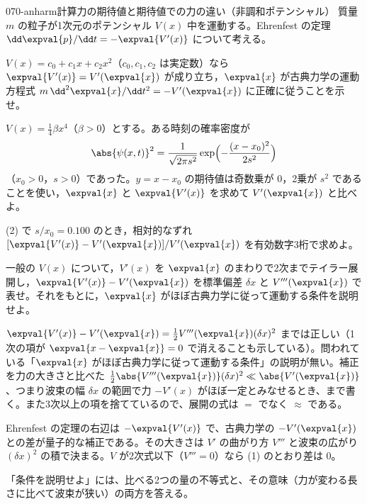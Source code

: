 \documentclass[uplatex,dvipdfmx,a4paper,11pt]{jsarticle}
\begin{document}
\mondaihen
{}
\begin{mondai}{070-anharm}{計算}{力の期待値と期待値での力の違い（非調和ポテンシャル）}
質量 $m$ の粒子が1次元のポテンシャル $V(x)$ 中を運動する。Ehrenfest の定理 $\dd\expval{p}/\dd t=-\expval{V'(x)}$ について考える。
  \begin{shoumon}
    \item $V(x)=c_{0}+c_{1}x+c_{2}x^{2}$（$c_{0},c_{1},c_{2}$ は実定数）なら $\expval{V'(x)}=V'(\expval{x})$ が成り立ち，$\expval{x}$ が古典力学の運動方程式 $m\,\dd^{2}\expval{x}/\dd t^{2}=-V'(\expval{x})$ に正確に従うことを示せ。
    \item $V(x)=\frac{1}{4}\beta x^{4}$（$\beta>0$）とする。ある時刻の確率密度が
    \[ \abs{\psi(x,t)}^{2}=\frac{1}{\sqrt{2\pi s^{2}}}\exp\Bigl(-\frac{(x-x_{0})^{2}}{2s^{2}}\Bigr) \]
    （$x_{0}>0$，$s>0$）であった。$y=x-x_{0}$ の期待値は奇数乗が $0$，2乗が $s^{2}$ であることを使い，$\expval{x}$ と $\expval{V'(x)}$ を求めて $V'(\expval{x})$ と比べよ。
    \item (2) で $s/x_{0}=\num{0.100}$ のとき，相対的なずれ $[\expval{V'(x)}-V'(\expval{x})]/V'(\expval{x})$ を有効数字3桁で求めよ。
    \item 一般の $V(x)$ について，$V'(x)$ を $\expval{x}$ のまわりで2次までテイラー展開し，$\expval{V'(x)}-V'(\expval{x})$ を標準偏差 $\delta x$ と $V'''(\expval{x})$ で表せ。それをもとに，$\expval{x}$ がほぼ古典力学に従って運動する条件を説明せよ。
  \end{shoumon}

\begin{kotaeran}
   $\expval{V'(x)}-V'(\expval{x})=\frac{1}{2}V'''(\expval{x})(\delta x)^{2}$ までは正しい（1次の項が $\expval{x-\expval{x}}=0$ で消えることも示している）。問われている「$\expval{x}$ がほぼ古典力学に従って運動する条件」の説明が無い。補正を力の大きさと比べた $\frac{1}{2}\abs{V'''(\expval{x})}(\delta x)^{2}\ll\abs{V'(\expval{x})}$、つまり波束の幅 $\delta x$ の範囲で力 $-V'(x)$ がほぼ一定とみなせるとき、まで書く。また3次以上の項を捨てているので、展開の式は $=$ でなく $\approx$ である。
\end{kotaeran}
\begin{rikai}
  \item Ehrenfest の定理の右辺は $-\expval{V'(x)}$ で、古典力学の $-V'(\expval{x})$ との差が量子的な補正である。その大きさは $V'$ の曲がり方 $V'''$ と波束の広がり $(\delta x)^{2}$ の積で決まる。$V$ が2次式以下（$V'''=0$）なら (1) のとおり差は $0$。
  \item 「条件を説明せよ」には、比べる2つの量の不等式と、その意味（力が変わる長さに比べて波束が狭い）の両方を答える。
\end{rikai}
\end{mondai}
\end{document}
